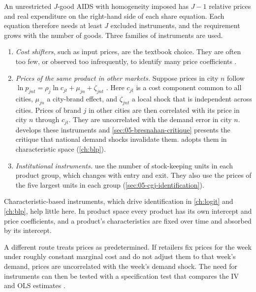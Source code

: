 An unrestricted $J$-good AIDS with homogeneity imposed has $J - 1$ relative prices and real expenditure on
the right-hand side of each share equation. Each equation therefore needs at least $J$ excluded
instruments, and the requirement grows with the number of goods. Three families of instruments are used.
\begin{enumerate}[label=(\alph*)]
  \item \emph{Cost shifters}, such as input prices, are the textbook choice. They are often too few, or
  observed too infrequently, to identify many price coefficients \citep[p.~219]{Hausman1997}.
  \item \emph{Prices of the same product in other markets.} Suppose prices in city $n$ follow $\ln p_{jnt}
  = \rho_j\ln c_{jt} + \mu_{jn} + \zeta_{jnt}$ \citep[eq.~8]{Hausman1997}. Here $c_{jt}$ is a cost
  component common to all cities, $\mu_{jn}$ a city-brand effect, and $\zeta_{jnt}$ a local shock that is
  independent across cities. Prices of brand $j$ in other cities are then correlated with its price in
  city $n$ through $c_{jt}$. They are uncorrelated with the demand error in city $n$.  develops these instruments and
  \cref{sec:05-bresnahan-critique} presents the critique that national demand shocks invalidate them.
  \citet{Nevo2001} adopts them in characteristic space (\cref{ch:blp}).
  \item \emph{Institutional instruments.} \citet{ChaudhuriGoldbergJia2006} use the number of
  stock-keeping units in each product group, which changes with entry and exit. They also use the prices
  of the five largest units in each group (\cref{sec:05-cgj-identification}).
\end{enumerate}
Characteristic-based instruments, which drive identification in \cref{ch:logit} and \cref{ch:blp}, help
little here. In product space every product has its own intercept and price coefficients, and a product's
characteristics are fixed over time and absorbed by its intercept.

A different route treats prices as predetermined. If retailers fix prices for the week under roughly
constant marginal cost and do not adjust them to that week's demand, prices are uncorrelated with the
week's demand shock. The need for instruments can then be tested with a specification test that compares
the IV and OLS estimates \citep{Hausman1978,Hausman1997}.

